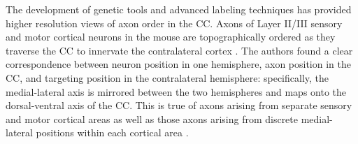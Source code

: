 The development of genetic tools and advanced labeling techniques has provided higher resolution views of axon order in the CC. 
Axons of Layer II/III sensory and motor cortical neurons in the mouse are topographically ordered as they traverse the CC to innervate the contralateral cortex \cite{zhou2013axon}. 
The authors found a clear correspondence between neuron position in one hemisphere, axon position in the CC, and targeting position in the contralateral hemisphere: specifically, the medial-lateral axis is mirrored between the two hemispheres and maps onto the dorsal-ventral axis of the CC. 
This is true of axons arising from separate sensory and motor cortical areas as well as those axons arising from discrete medial-lateral positions within each cortical area \cite{zhou2013axon}. 


